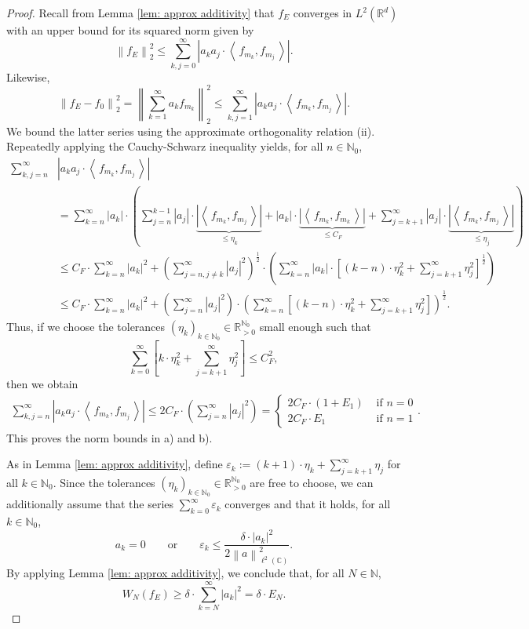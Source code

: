 \documentclass[11pt]{amsart}
\newcommand{\R}{{\mathbb{R}}}
\newcommand{\C}{{\mathbb{C}}}
\newcommand{\N}{\mathbb{N}}
\newcommand{\norm}[1]{\ensuremath{\left\lVert\text{}#1\text{}\right\rVert}}
\newcommand{\ip}[1]{\ensuremath{\left<\text{} \, #1 \, \text{}\right>}}
\newenvironment{proof sketch} {\textit{Proof sketch.}}{}
\begin{document}
\begin{proof}
    Recall from Lemma \ref{lem: approx additivity} that $f_E$ converges in $L^2(\R^d)$ with an upper bound for its squared norm given by 
    \[\norm{f_E}_2^2\leq \sum_{k,j=0}^\infty\left|a_ka_j \cdot \ip{f_{m_k},f_{m_j}}\right|.\] 
    Likewise,   
    \[\norm{f_E-f_0}_2^2=\norm{\sum_{k=1}^\infty a_k f_{m_k}}_2^2 \leq \sum_{k,j=1}^\infty\left|a_ka_j \cdot \ip{f_{m_k},f_{m_j}}\right|.\] 
    We bound the latter series using the approximate orthogonality relation (ii). Repeatedly applying the Cauchy-Schwarz inequality yields, for all $n \in \N_0$,
    \begin{align*}\label{convergence of f}
      \sum_{k,j=n}^\infty&\left|a_ka_j \cdot \ip{f_{m_k},f_{m_j}}\right| \\
      & = \sum_{k=n}^\infty |a_k| \cdot \left(\sum_{j=n}^{k-1} |a_j| \cdot \underbrace{\left|\ip{f_{m_k},f_{m_j}}\right|}_{\leq \eta_k} 
      + |a_k| \cdot \underbrace{\left|\ip{f_{m_k},f_{m_k}}\right|}_{\leq C_F} 
      + \sum_{j=k+1}^\infty |a_j| \cdot \underbrace{\left|\ip{f_{m_k},f_{m_j}}\right|}_{\leq \eta_j}\right) \\
      & \leq C_F \cdot \sum_{k=n}^\infty |a_k|^2 
      +  \left(\sum_{j=n, j\neq k}^\infty |a_j|^2\right)^{\frac{1}{2}} \cdot \left(\sum_{k=n}^\infty |a_k| \cdot \left[(k-n)\cdot \eta_k^2 
      + \sum_{j=k+1}^\infty \eta_j^2\right]^{\frac{1}{2}}\right) \\
      & \leq C_F \cdot \sum_{k=n}^\infty |a_k|^2 
      +  \left(\sum_{j=n}^\infty |a_j|^2\right) \cdot \left(\sum_{k=n}^\infty \left[(k-n)\cdot \eta_k^2 
      + \sum_{j=k+1}^\infty \eta_j^2\right]\right)^{\frac{1}{2}}.       
    \end{align*}
    Thus, if we choose the tolerances $(\eta_k)_{k \in \N_0} \in \R_{>0}^{\N_0}$ small enough such that 
    \[\sum_{k=0}^\infty \left[k\cdot \eta_k^2 
    + \sum_{j=k+1}^\infty \eta_j^2\right]\leq C_F^2,\]
    then we obtain 
    \begin{align*}
      \sum_{k,j=n}^\infty\left|a_ka_j \cdot \ip{f_{m_k},f_{m_j}}\right|\leq 2C_F \cdot \left(\sum_{j=n}^\infty |a_j|^2\right) = \begin{cases}
        2C_F \cdot (1+E_1) &\text{ if } n=0\\
        2C_F \cdot E_1 &\text{ if } n=1
      \end{cases}.
    \end{align*}
    This proves the norm bounds in a) and b).
  
    As in Lemma \ref{lem: approx additivity}, define $\varepsilon_k:=(k+1)\cdot \eta_k+\sum_{j=k+1}^\infty \eta_j$ for all $k \in \N_0$. Since the tolerances $(\eta_k)_{k \in \N_0} \in \R_{>0}^{\N_0}$ are free to choose, we can additionally assume 
    that the series $\sum_{k=0}^\infty \varepsilon_k$ converges and that it holds, for all $k \in \N_0$,
    \[a_k=0 \qquad \text{or} \qquad \varepsilon_k\leq \frac{\delta \cdot |a_k|^2}{2\norm{a}_{\ell^2(\C)}^2}.\] By applying Lemma \ref{lem: approx additivity}, we conclude that, for all $N\in \N$,
    \[W_N(f_E)\geq \delta \cdot \sum_{k=N}^\infty |a_k|^2 = \delta \cdot E_N.\]
  \end{proof}
  
\end{document}
